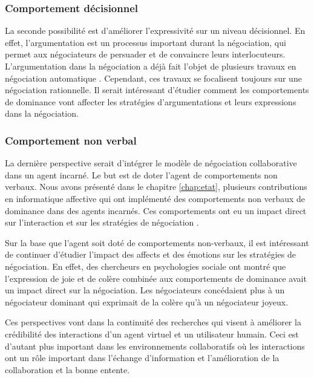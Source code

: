 	\subsubsection{Comportement décisionnel}
	La seconde possibilité est d'améliorer l'expressivité sur un niveau décisionnel. En effet, l'argumentation est un processus important durant la négociation, qui permet aux négociateurs de persuader et de convaincre leurs interlocuteurs. L'argumentation dans la négociation a déjà fait l'objet de plusieurs travaux en négociation automatique \cite{toni2010argumentative,oliva2010argumentation}. Cependant, ces travaux se focalisent toujours sur une négociation rationnelle. Il serait intéressant d'étudier comment les comportements de dominance vont affecter les stratégies d'argumentations et leurs expressions dans la négociation.
	
	\subsubsection{Comportement non verbal}
	La dernière perspective serait d'intégrer le modèle de négociation collaborative dans un agent incarné. Le but est de doter l'agent de comportements non verbaux. Nous avons présenté dans le chapitre \ref{chap:etat}, plusieurs contributions en informatique affective qui ont implémenté des comportements non verbaux de dominance dans des agents incarnés. Ces comportements ont eu un impact direct sur l'interaction et sur les stratégies de négociation \cite{de2011effect,de2015humans}. 
	
	Sur la base que l'agent soit doté de comportements non-verbaux, il est intéressant de continuer d'étudier l'impact des affects et des émotions sur les stratégies de négociation.  En effet, des chercheurs en psychologies sociale \cite{van2006power} ont montré que l'expression de  joie et de colère combinée aux comportements de dominance avait un impact direct sur la négociation. Les négociateurs concédaient plus à un négociateur dominant qui exprimait de la colère qu'à un négociateur joyeux. 
	
	
	
	Ces perspectives vont dans la continuité des recherches qui visent à améliorer la crédibilité des interactions d'un agent virtuel et un utilisateur humain. Ceci est d'autant plus important dans les environnements collaboratifs où les interactions ont un rôle important dans l'échange d'information et l'amélioration de la collaboration et la bonne entente.  
	 
	
	
	 
	
	
	